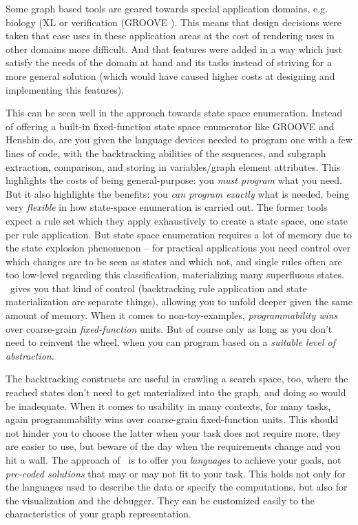Some graph based tools are geared towards special application domains, e.g. biology (XL \cite{xl} or verification (GROOVE \cite{Groove}).
This means that design decisions were taken that ease uses in these application areas at the cost of rendering uses in other domains more difficult.
And that features were added in a way which just satisfy the needs of the domain at hand and its tasks instead of striving for a more general solution (which would have caused higher costs at designing and implementing this features).

This can be seen well in the approach towards state space enumeration. 
Instead of offering a built-in fixed-function state space enumerator like GROOVE and Henshin do, are you given the language devices needed to program one with a few lines of code, with the backtracking abilities of the sequences, and subgraph extraction, comparison, and storing in variables/graph element attributes.
This highlights the costs of being general-purpose: you \emph{must program} what you need.
But it also highlights the benefits: you \emph{can program exactly} what is needed, being very \emph{flexible} in how state-space enumeration is carried out.
The former tools expect a rule set which they apply exhaustively to create a state space, one state per rule application. 
But state space enumeration requires a lot of memory due to the state explosion phenomenon -- for practical applications you need control over which changes are to be seen as states and which not, and single rules often are too low-level regarding this classification, materializing many superfluous states.
\GrG\ gives you that kind of control (backtracking rule application and state materialization are separate things), allowing you to unfold deeper given the same amount of memory. 
When it comes to non-toy-examples, \emph{programmability wins} over coarse-grain \emph{fixed-function} units.
But of course only as long as you don't need to reinvent the wheel, when you can program based on a \emph{suitable level of abstraction}.

The backtracking constructs are useful in crawling a search space, too, where the reached states don't need to get materialized into the graph, and doing so would be inadequate.
When it comes to usability in many contexts, for many tasks, again programmability wins over coarse-grain fixed-function units.
This should not hinder you to choose the latter when your task does not require more, they are easier to use, but beware of the day when the requirements change and you hit a wall.
The approach of \GrG\ is to offer you \emph{languages} to achieve your goals, not \emph{pre-coded solutions} that may or may not fit to your task.
This holds not only for the languages used to describe the data or specify the computations, but also for the visualization and the debugger. They can be customized easily to the characteristics of your graph representation. 

